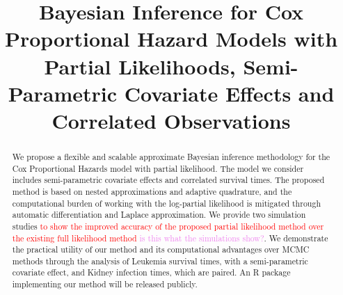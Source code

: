 \documentclass[ba]{imsart}
\newcommand{\highlight}[1]{\textcolor{red}{#1}}
\newcommand{\alex}[1]{\textcolor{violet}{{ }#1}}
\begin{document}

\begin{frontmatter}
\title{Bayesian Inference for Cox Proportional Hazard Models with Partial Likelihoods, Semi-Parametric Covariate Effects and Correlated Observations}

\runtitle{}


\begin{abstract}
We propose a flexible and scalable approximate Bayesian inference methodology for the Cox Proportional Hazards model with partial likelihood. The model we consider includes semi-parametric covariate effects and correlated survival times. The proposed method is based on nested approximations and adaptive quadrature, and the computational burden of working with the log-partial likelihood is mitigated through automatic differentiation and Laplace approximation. We provide two simulation studies \highlight{to show the improved accuracy of the proposed partial likelihood method over the existing full likelihood method}\alex{is this what the simulations show?}. We demonstrate the practical utility of our method and its computational advantages over MCMC methods through the analysis of Leukemia survival times, with a semi-parametric covariate effect, and Kidney infection times, which are paired. An R package implementing our method will be released publicly.
\end{abstract}

\begin{keyword}
\end{keyword}

\end{frontmatter}
\end{document}
